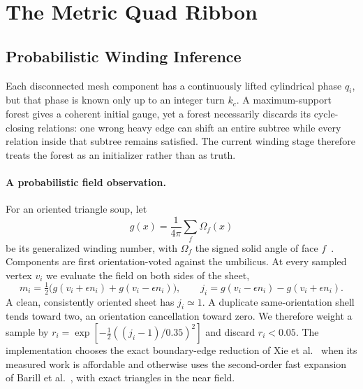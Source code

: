 \section{The Metric Quad Ribbon}
\label{sec:quadribbon}


\subsection{Probabilistic Winding Inference}
\label{sec:prob-winding}

Each disconnected mesh component has a continuously lifted cylindrical phase $q_i$, but that phase is known only up to an integer turn $k_c$. A maximum-support forest gives a coherent initial gauge, yet a forest necessarily discards its cycle-closing relations: one wrong heavy edge can shift an entire subtree while every relation inside that subtree remains satisfied. The current winding stage therefore treats the forest as an initializer rather than as truth.

\paragraph{A probabilistic field observation.} For an oriented triangle soup, let
\begin{equation*}
  g(x)=\frac{1}{4\pi}\sum_{f}\Omega_f(x)
\end{equation*}
be its generalized winding number, with $\Omega_f$ the signed solid angle of face $f$~\cite{jacobson2013winding}. Components are first orientation-voted against the umbilicus. At every sampled vertex $v_i$ we evaluate the field on both sides of the sheet,
\begin{equation*}
  m_i=\tfrac12\bigl(g(v_i+\epsilon n_i)+g(v_i-\epsilon n_i)\bigr),
  \qquad
  j_i=g(v_i-\epsilon n_i)-g(v_i+\epsilon n_i).
\end{equation*}
A clean, consistently oriented sheet has $j_i\simeq1$. A duplicate same-orientation shell tends toward two, an orientation cancellation toward zero. We therefore weight a sample by
$r_i=\exp[-\tfrac12((j_i-1)/0.35)^2]$ and discard $r_i<0.05$. The implementation chooses the exact boundary-edge reduction of Xie et al.~ when its measured work is affordable and otherwise uses the second-order fast expansion of Barill et al.~, with exact triangles in the near field.

